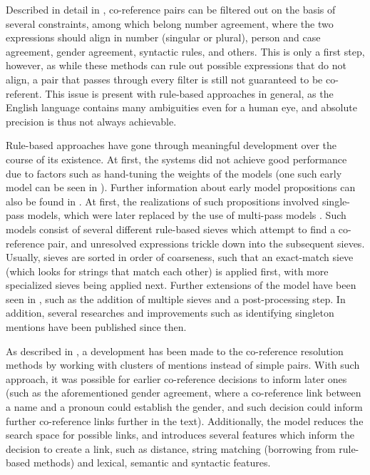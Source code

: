 \documentclass[a4paper, 11pt]{article}
\begin{document}
Described in detail in \citet{jurafsky}, co-reference pairs can be filtered out on the basis of several constraints, among which belong number agreement, where the two expressions should align in number (singular or plural), person and case agreement, gender agreement, syntactic rules, and others. This is only a first step, however, as while these methods can rule out possible expressions that do not align, a pair that passes through every filter is still not guaranteed to be co-referent. This issue is present with rule-based approaches in general, as the English language contains many ambiguities even for a human eye, and absolute precision is thus not always achievable.

Rule-based approaches have gone through meaningful development over the course of its existence. At first, the systems did not achieve good performance due to factors such as hand-tuning the weights of the models (one such early model can be seen in \citet{lappin}). Further information about early model propositions can also be found in \citet{baldwin}. At first, the realizations of such propositions involved single-pass models, which were later replaced by the use of multi-pass models \citep{raghunathan2010}. Such models consist of several different rule-based sieves which attempt to find a co-reference pair, and unresolved expressions trickle down into the subsequent sieves. Usually, sieves are sorted in order of coarseness, such that an exact-match sieve (which looks for strings that match each other) is applied first, with more specialized sieves being applied next. Further extensions of the model have been seen in \citet{lee11conllst}, such as the addition of multiple sieves and a post-processing step. In addition, several researches and improvements such as identifying singleton mentions \citep{recasens_demarneffe_potts2013} have been published since then.

As described in \citet{clark2015entity}, a development has been made to the co-reference resolution methods by working with clusters of mentions instead of simple pairs. With such approach, it was possible for earlier co-reference decisions to inform later ones (such as the aforementioned gender agreement, where a co-reference link between a name and a pronoun could establish the gender, and such decision could inform further co-reference links further in the text). Additionally, the model reduces the search space for possible links, and introduces several features which inform the decision to create a link, such as distance, string matching (borrowing from rule-based methods) and lexical, semantic and syntactic features.
\end{document}
